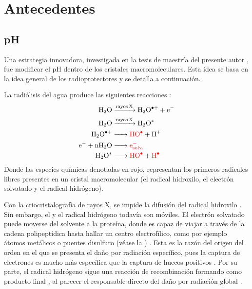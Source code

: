\chapter{Antecedentes}
\section{pH}
Una estrategia innovadora, investigada en la tesis de maestría del presente autor%
, fue modificar el pH dentro de los cristales macromoleculares. Esta idea se basa en la idea general de los radioprotectores y se detalla a continuación. 

La radiólisis del agua produce las siguientes reacciones :
\begin{align}
	\ce{H2O           &->[rayos X]     H2O^{.+}    +             e^{-}}  \\
	\ce{H2O           &->[rayos X]     H2O^{*}}                          \\
	\ce{H2O^{.+}      &->  \color{red}HO^{.}       +              H^{+}} \\
	\ce{e^{-} + nH2O  &->  \color{red}e^{-}_{solv.}}                     \\
	\ce{H2O^{*}       &->  \color{red}HO^{.}       +   \color{red}H^{.}}
\end{align} 
Donde las especies químicas denotadas en rojo, representan los primeros radicales libres presentes en un cristal macromolecular (el radical hidroxilo, el electrón solvatado y el radical hidrógeno).%

Con la criocristalografía de rayos X, se impide la difusión del radical hidroxilo . Sin embargo, el  y el radical hidrógeno todavía son móviles. El electrón solvatado puede moverse del solvente a la proteína, donde es capaz de viajar a través de la cadena polipeptídica hasta hallar un centro electrofílico, como por ejemplo átomos metálicos o puentes disulfuro (véase la ) . Esta es la razón del origen del orden en el que se presenta el daño por radiación específico, pues la captura de electrones es mucho más específica que la captura de huecos positivos . Por su parte, el radical hidrógeno sigue una reacción de recombinación formando como producto final , al parecer el responsable directo del daño por radiación global .

